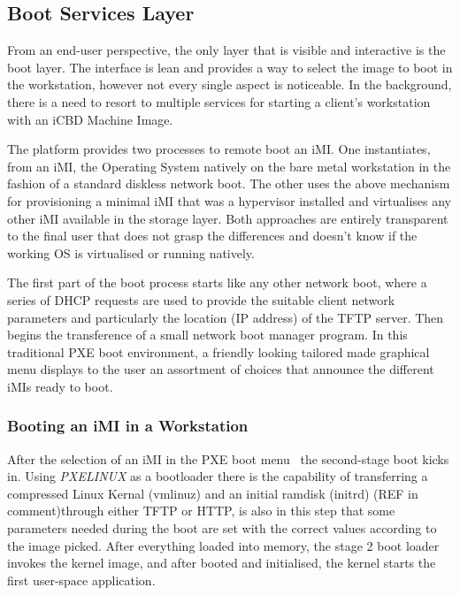 \subsection{Boot Services Layer}
\label{sub:icbd_architecture_boot}


From an end-user perspective, the only layer that is visible and interactive is the boot layer. The interface is lean and provides a way to select the image to boot in the workstation, however not every single aspect is noticeable. In the background, there is a need to resort to multiple services for starting a client's workstation with an iCBD Machine Image.

The platform provides two processes to remote boot an iMI. One instantiates, from an iMI, the Operating System natively on the bare metal workstation in the fashion of a standard diskless network boot. The other uses the above mechanism for provisioning a minimal iMI that was a hypervisor installed and virtualises any other iMI available in the storage layer. Both approaches are entirely transparent to the final user that does not grasp the differences and doesn't know if the working OS is virtualised or running natively.

The first part of the boot process starts like any other network boot, where a series of DHCP requests are used to provide the suitable client network parameters and particularly the location (IP address) of the TFTP server. Then begins the transference of a small network boot manager program. In this traditional PXE boot environment, a friendly looking tailored made graphical menu displays to the user an assortment of choices that announce the different iMIs ready to boot.

\subsubsection{Booting an iMI in a Workstation }
\label{subsub:booting_imi}
After the selection of an iMI in the PXE boot menu~\cite{ibm_linux_boot} the second-stage boot kicks in. Using \textit{PXELINUX} as a bootloader there is the capability of transferring a compressed Linux Kernal (vmlinuz) and an initial ramdisk (initrd) (REF in comment)through either TFTP or HTTP, is also in this step that some parameters needed during the boot are set with the correct values according to the image picked. After everything loaded into memory, the stage 2 boot loader invokes the kernel image, and after booted and initialised, the kernel starts the first user-space application. 

